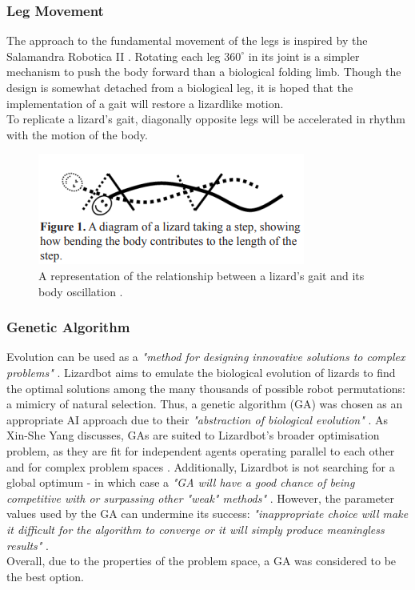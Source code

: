 \documentclass{article}
\begin{document}
\subsubsection{Leg Movement}
\label{sec:Leg Movement}
The approach to the fundamental movement of the legs is inspired by the Salamandra Robotica II . Rotating each leg $360^\circ$ in its joint is a simpler mechanism to push the body forward than a biological folding limb. Though the design is somewhat detached from a biological leg, it is hoped that the implementation of a gait will restore a lizardlike motion.\\
To replicate a lizard's gait, diagonally opposite legs will be accelerated in rhythm with the motion of the body. 
\begin{figure}[H]
\centering
\includegraphics[scale=1]{lizardGait}
\caption{A representation of the relationship between a lizard's gait and its body oscillation \citep{reptileLocomotion}.}
\end{figure}

\newpage
\subsubsection{Genetic Algorithm}
\label{sec:Genetic Algorithm Aims}
Evolution can be used as a \textit{"method for designing innovative solutions to complex problems"} . Lizardbot aims to emulate the biological evolution of lizards to find the optimal solutions among the many thousands of possible robot permutations: a mimicry of natural selection.
Thus, a genetic algorithm (GA) was chosen as an appropriate AI approach due to their \textit{"abstraction of biological evolution"} . As Xin-She Yang discusses, GAs are suited to Lizardbot's broader optimisation problem, as they are fit for independent agents operating parallel to each other and for complex problem spaces . Additionally, Lizardbot is not searching for a global optimum - in which case a \textit{"GA will have a good chance of being competitive with or surpassing other "weak" methods"} . However, the parameter values used by the GA can undermine its success: \textit{"inappropriate choice will make it difficult for the algorithm to converge or it will simply produce meaningless results"} . \\
Overall, due to the properties of the problem space, a GA was considered to be the best option.\\
\end{document}
